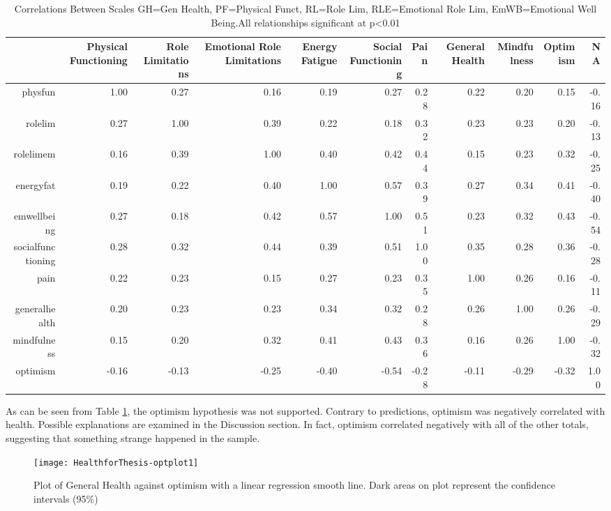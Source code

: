 \documentclass{article}
\begin{document}
\begin{table}[ht]
\centering

\begin{tabular}{rrrrrrrrrrr}
  \hline
 & Physical Functioning & Role Limitations & Emotional Role Limitations & Energy Fatigue & Social Functioning & Pain & General Health & Mindfulness & Optimism & NA \\ 
  \hline
physfun & 1.00 & 0.27 & 0.16 & 0.19 & 0.27 & 0.28 & 0.22 & 0.20 & 0.15 & -0.16 \\ 
  rolelim & 0.27 & 1.00 & 0.39 & 0.22 & 0.18 & 0.32 & 0.23 & 0.23 & 0.20 & -0.13 \\ 
  rolelimem & 0.16 & 0.39 & 1.00 & 0.40 & 0.42 & 0.44 & 0.15 & 0.23 & 0.32 & -0.25 \\ 
  energyfat & 0.19 & 0.22 & 0.40 & 1.00 & 0.57 & 0.39 & 0.27 & 0.34 & 0.41 & -0.40 \\ 
  emwellbeing & 0.27 & 0.18 & 0.42 & 0.57 & 1.00 & 0.51 & 0.23 & 0.32 & 0.43 & -0.54 \\ 
  socialfunctioning & 0.28 & 0.32 & 0.44 & 0.39 & 0.51 & 1.00 & 0.35 & 0.28 & 0.36 & -0.28 \\ 
  pain & 0.22 & 0.23 & 0.15 & 0.27 & 0.23 & 0.35 & 1.00 & 0.26 & 0.16 & -0.11 \\ 
  generalhealth & 0.20 & 0.23 & 0.23 & 0.34 & 0.32 & 0.28 & 0.26 & 1.00 & 0.26 & -0.29 \\ 
  mindfulness & 0.15 & 0.20 & 0.32 & 0.41 & 0.43 & 0.36 & 0.16 & 0.26 & 1.00 & -0.32 \\ 
  optimism & -0.16 & -0.13 & -0.25 & -0.40 & -0.54 & -0.28 & -0.11 & -0.29 & -0.32 & 1.00 \\ 
   \hline
\end{tabular}
\caption{Correlations Between Scales GH=Gen Health, PF=Physical Funct, RL=Role Lim, RLE=Emotional Role Lim, EmWB=Emotional Well Being.All relationships significant at p<0.01} 
\label{tab:scalecorr}
\end{table}


As can be seen from Table \ref{tab:scalecorr}, the optimism hypothesis
was not supported.  Contrary to predictions, optimism was negatively
correlated with health.
Possible explanations are examined in the Discussion section.  In fact, optimism correlated negatively with all of the other totals, suggesting that something strange happened in the sample.

\begin{figure}
\texttt{[image: HealthforThesis-optplot1]}
  \caption{Plot of General Health against optimism with a linear regression smooth line. Dark areas on plot represent the confidence intervals (95\%)}
  \label{fig:optplot1}
\end{figure}
\end{document}
